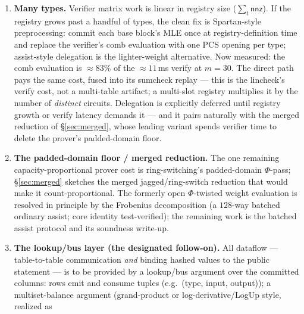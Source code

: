 \documentclass[11pt]{article}
\newcommand{\nnz}{\mathsf{nnz}}
\theoremstyle{definition}
\begin{document}
\begin{enumerate}[nosep]
        $\hat s_v$ capture and the per-slot claim folds must skip dummy
        rows via the same run-lists. \emph{Delivered}: implemented
        end-to-end behind proof-byte fixtures, with the adversarial
        low-utilization benchmark in place (Implementation status,
        \S\ref{sec:roadmap}); the one structural exception is the
        $b$-side of the virtual-opening sumcheck, which is irreducibly
        dense (\S\ref{sec:commit}).
  \item \label{item:manytypes}\textbf{Many types.} Verifier matrix work
        is linear in registry
        size ($\sum_t \nnz$). If the registry grows past a handful of
        types, the clean fix is Spartan-style preprocessing: commit each
        base block's MLE once at registry-definition time and replace the
        verifier's comb evaluation with one PCS opening per type;
        assist-style delegation is the lighter-weight alternative. Now
        measured: the comb evaluation is $\approx 83\%$ of the
        $\approx 11$\,ms verify at $m = 30$. The direct path pays the
        same cost, fused into its sumcheck replay --- this is the
        lincheck's verify cost, not a multi-table artifact; a
        multi-slot registry multiplies it by the number of
        \emph{distinct} circuits. Delegation is explicitly deferred
        until registry growth or verify latency demands it --- and it
        pairs naturally with the merged reduction of \S\ref{sec:merged},
        whose leading variant spends verifier time to delete the
        prover's padded-domain floor.
  \item \textbf{The padded-domain floor / merged reduction.} The one
        remaining capacity-proportional prover cost is ring-switching's
        padded-domain $\Phi$-pass; \S\ref{sec:merged} sketches the
        merged jagged/ring-switch reduction that would make it
        count-proportional. The formerly open $\Phi$-twisted weight
        evaluation is resolved in principle by the Frobenius
        decomposition (a $128$-way batched ordinary assist; core
        identity test-verified); the remaining work is the batched
        assist protocol and its soundness write-up.
  \item \textbf{The lookup/bus layer (the designated follow-on).} All
        dataflow --- table-to-table communication \emph{and} binding
        hashed values to the public statement --- is to be provided by a
        lookup/bus argument over the committed columns: rows emit and
        consume tuples (e.g.\ (type, input, output)); a multiset-balance
        argument (grand-product or log-derivative/LogUp style, realized as

\end{enumerate}
\end{document}

